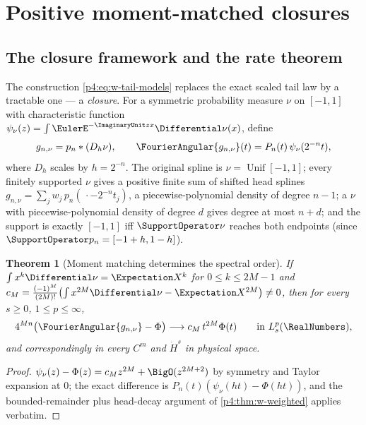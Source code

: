 \documentclass[11pt,oneside]{article}
\numberwithin{equation}{section}
\newtheorem{theorem}{Theorem}[section]
\theoremstyle{definition}
\theoremstyle{remark}
\begin{document}

\section{Positive moment-matched closures}
\label{p4:sec:w-closures}

\subsection{The closure framework and the rate theorem}

The construction \eqref{p4:eq:w-tail-models} replaces the exact scaled tail
law by a tractable one --- a \emph{closure}.  For a symmetric probability
measure $\nu$ on $[-1,1]$ with characteristic function
$\psi_\nu(z)=\int\EulerE^{-\ImaginaryUnit zx}\Differential\nu(x)$, define
\begin{equation}
 g_{n,\nu}=p_n*(D_h\nu),
 \qquad
 \FourierAngular{g_{n,\nu}}(t)=P_n(t)\,\psi_\nu(2^{-n}t),
 \label{p4:eq:w-closure}
\end{equation}
where $D_h$ scales by $h=2^{-n}$.  The original spline is
$\nu=\operatorname{Unif}[-1,1]$; every finitely supported $\nu$ gives a
positive finite sum of shifted head splines
$g_{n,\nu}=\sum_jw_j\,p_n(\,\cdot-2^{-n}t_j)$, a piecewise-polynomial
density of degree $n-1$; a $\nu$ with piecewise-polynomial density of
degree $d$ gives degree at most $n+d$; and the support is exactly $[-1,1]$
iff $\SupportOperator\nu$ reaches both endpoints (since
$\SupportOperator p_n=[-1+h,1-h]$).

\begin{theorem}[Moment matching determines the spectral order]
\label{p4:thm:w-closure-rate}
If $\int x^k\Differential\nu=\Expectation X^k$ for $0\le k\le2M-1$ and
$c_M=\frac{(-1)^M}{(2M)!}\bigl(\int x^{2M}\Differential\nu-\Expectation X^{2M}\bigr)\ne0$,
then for every $s\ge0$, $1\le p\le\infty$,
\begin{equation}
 4^{Mn}\bigl(\FourierAngular{g_{n,\nu}}-\Phi\bigr)
 \longrightarrow c_M\,t^{2M}\Phi(t)
 \qquad\text{in }L^p_s(\RealNumbers),
 \label{p4:eq:w-closure-limit}
\end{equation}
and correspondingly in every $C^m$ and $\dot H^s$ in physical space.
\end{theorem}

\begin{proof}
$\psi_\nu(z)-\Phi(z)=c_Mz^{2M}+\BigO(z^{2M+2})$ by symmetry and Taylor
expansion at $0$; the exact difference is
$P_n(t)(\psi_\nu(ht)-\Phi(ht))$, and the bounded-remainder plus
head-decay argument of \cref{p4:thm:w-weighted} applies verbatim.
\end{proof}
\end{document}
